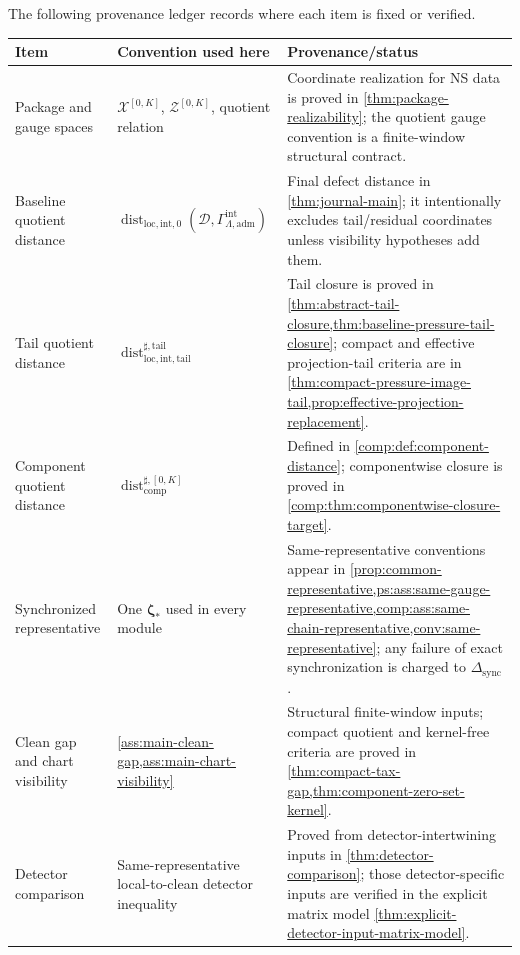 \documentclass[11pt]{article}
\numberwithin{equation}{section}
\theoremstyle{definition}
\theoremstyle{remark}
\newcommand{\loc}{\mathrm{loc}}
\newcommand{\intg}{\mathrm{int}}
\newcommand{\tail}{\mathrm{tail}}
\newcommand{\adm}{\mathrm{adm}}
\newcommand{\comp}{\mathrm{comp}}
\newcommand{\sync}{\mathrm{sync}}
\newcommand{\Dist}{\operatorname{dist}}
\newcommand{\calD}{\mathcal D}
\newcommand{\calX}{\mathcal X}
\newcommand{\calZ}{\mathcal Z}
\newcommand{\bzeta}{\boldsymbol\zeta}
\begin{document}
The following provenance ledger records where each item is fixed or verified.
\begin{center}
\small
\begin{tabular}{p{}p{}p{}}
\hline
\textbf{Item} & \textbf{Convention used here} & \textbf{Provenance/status}\\
\hline
Package and gauge spaces & \(\calX^{[0,K]}\), \(\calZ^{[0,K]}\), quotient relation & Coordinate realization for NS data is proved in \cref{thm:package-realizability}; the quotient gauge convention is a finite-window structural contract.\\
Baseline quotient distance & \(\Dist_{\loc,\intg,0}(\calD,\Gamma^{\intg}_{\Lambda,\adm})\) & Final defect distance in \cref{thm:journal-main}; it intentionally excludes tail/residual coordinates unless visibility hypotheses add them.\\
Tail quotient distance & \(\Dist^{\sharp,\tail}_{\loc,\intg,\tail}\) & Tail closure is proved in \cref{thm:abstract-tail-closure,thm:baseline-pressure-tail-closure}; compact and effective projection-tail criteria are in \cref{thm:compact-pressure-image-tail,prop:effective-projection-replacement}.\\
Component quotient distance & \(\Dist^{\sharp,[0,K]}_{\comp}\) & Defined in \cref{comp:def:component-distance}; componentwise closure is proved in \cref{comp:thm:componentwise-closure-target}.\\
Synchronized representative & One \(\bzeta_*\) used in every module & Same-representative conventions appear in \cref{prop:common-representative,ps:ass:same-gauge-representative,comp:ass:same-chain-representative,conv:same-representative}; any failure of exact synchronization is charged to \(\Delta_{\sync}\).\\
Clean gap and chart visibility & \cref{ass:main-clean-gap,ass:main-chart-visibility} & Structural finite-window inputs; compact quotient and kernel-free criteria are proved in \cref{thm:compact-tax-gap,thm:component-zero-set-kernel}.\\
Detector comparison & Same-representative local-to-clean detector inequality & Proved from detector-intertwining inputs in \cref{thm:detector-comparison}; those detector-specific inputs are verified in the explicit matrix model \cref{thm:explicit-detector-input-matrix-model}.\\
\hline
\end{tabular}
\end{center}
\end{document}
